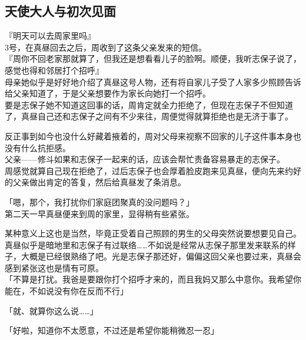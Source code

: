 \subsection{天使大人与初次见面}

『明天可以去周家里吗』\\

3号，在真昼回去之后，周收到了这条父亲发来的短信。\\

『周你不回老家那就算了，但我还是想看看儿子的脸啊。顺便，我听志保子说了，感觉也得和邻居打个招呼』\\

母亲她似乎是好好地介绍了真昼这号人物，还有将自家儿子受了人家多少照顾告诉给父亲知道了，于是父亲想要作为家长向她打一个招呼。\\

要是志保子她不知道这回事的话，周肯定就全力拒绝了，但现在志保子不但知道了，真昼自己还和志保子之间有不少来往，周便觉得就算拒绝也是无济于事了。

反正事到如今也没什么好藏着掖着的，周对父母来视察不回家的儿子这件事本身也没有什么抗拒感。\\

父亲——修斗如果和志保子一起来的话，应该会帮忙责备容易暴走的志保子。\\

周感觉就算自己现在拒绝了，过后志保子也会厚着脸皮跑来见真昼，便向先来约好的父亲做出肯定的答复，然后给真昼发了条消息。\\

\vspace{2\baselineskip}

「嗯，那个，我打扰你们家庭团聚真的没问题吗？」\\

第二天一早真昼便来到周的家里，显得稍有些紧张。

某种意义上这也是当然，毕竟正受着自己照顾的男生的父母突然说要想要见自己。\\

真昼似乎是暗地里和志保子有过联络……不如说是经常从志保子那里发来联系的样子，大概是已经很熟络了吧。光是志保子那还好，偏偏这回父亲也要过来，真昼会感到紧张这也是情有可原。\\

「不算是打扰。我爸是要跟你打个招呼才来的，而且我妈又那么中意你。我希望你能在，不如说没有你在反而不行」

「就、就算你这么说……」

「好啦，知道你不太愿意，不过还是希望你能稍微忍一忍」\\

